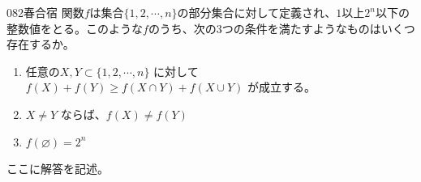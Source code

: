 \begin{prob}{082}{}{春合宿}
 関数$f$は集合$\{1, 2, \cdots, n\}$の部分集合に対して定義され、$1$以上$2^n$以下の整数値をとる。このような$f$のうち、次の3つの条件を満たすようなものはいくつ存在するか。
 \begin{enumerate}
  \renewcommand{\labelenumi}{\arabic{enumi}.}
  \item 任意の$X, Y \subset \{1, 2, \cdots, n\}$ に対して $f(X)+f(Y) \ge f(X\cap Y)+f(X\cup Y)$ が成立する。
  \item $X \neq Y$ ならば、$f(X)\neq f(Y)$
  \item $f(\varnothing)=2^n$
 \end{enumerate}
\end{prob}
ここに解答を記述。